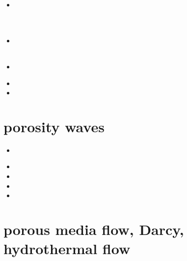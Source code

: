 \begin{small}
\begin{itemize}
\item[\twothousandtwentythree] 
 \\
 \\ 
 \\ 
\item[\twothousandtwentyfour]
 \\
 \\
\item[\twothousandtwentyfive]
 \\
\item[2026]
\item[2027]
\end{itemize}
\end{small}







\section{porosity waves} 

\begin{small}
\begin{itemize}
\item[2015]  \\ 
\item[2016] 
\item[2018] 
\item[2020] 
\item[2022] 
\end{itemize}
\end{small}


\section{porous media flow, Darcy, hydrothermal flow} 

